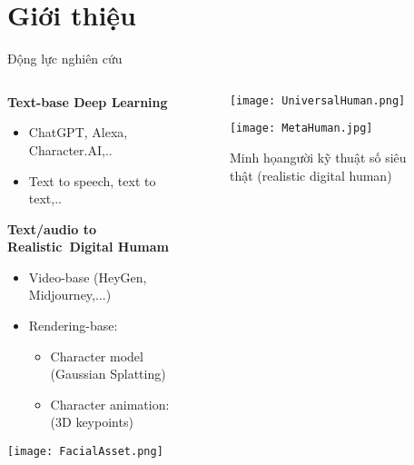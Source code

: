 \section{Giới thiệu}

\begin{frame}{Động lực nghiên cứu}
	\vspace{5pt}
	
	\begin{columns}
	\begin{column}{0.7\textwidth}
		\textbf{Text-base Deep Learning}
		\begin{itemize}
			\item ChatGPT, Alexa, Character.AI,..
			\item Text to speech, text to text,..
		\end{itemize}
		
		\textbf{Text/audio to Realistic Digital Humam}
		
		\begin{itemize}
			\item Video-base (HeyGen, Midjourney,...)
			\item Rendering-base:
			\begin{itemize}
				\item Character model (Gaussian Splatting)
				\item Character animation: (3D keypoints)
			\end{itemize}
		\end{itemize}
		\vspace{5pt}
		\centering
		\texttt{[image: FacialAsset.png]}
	\end{column}
	
	\begin{column}{0.3\textwidth}
		\begin{figure}
				\texttt{[image: UniversalHuman.png]}
		\end{figure}
		
		\begin{figure}
			\texttt{[image: MetaHuman.jpg]}
			\caption{\small Minh họangười kỹ thuật số siêu thật (realistic digital human)}
		\end{figure}
	
	\end{column}
	
	\end{columns}
\end{frame}



